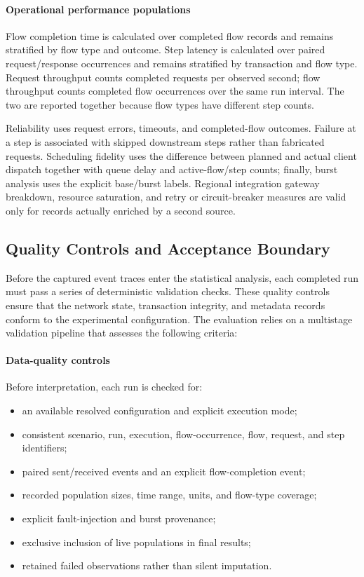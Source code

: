 \paragraph{Operational performance populations}
\noindent Flow completion time is calculated over completed flow records and remains
stratified by flow type and outcome. Step latency is calculated over paired
request/response occurrences and remains stratified by transaction and flow
type. Request throughput counts completed requests per observed second;
flow throughput counts completed flow occurrences over the same run interval.
The two are reported together because flow types have different step counts.

\noindent Reliability uses request errors, timeouts, and completed-flow outcomes. Failure
at a step is associated with skipped downstream steps rather than fabricated
requests. Scheduling fidelity uses the difference between planned and actual
client dispatch together with queue delay and active-flow/step counts; finally, burst analysis uses the explicit base/burst labels. Regional integration gateway breakdown, resource saturation, and retry or circuit-breaker measures are valid only for records actually enriched by a second source.

\subsection{Quality Controls and Acceptance Boundary}
\label{subsec:rdg-quality-acceptance}

\noindent Before the captured event traces enter the statistical analysis, each
completed run must pass a series of deterministic validation checks. These
quality controls ensure that the network state, transaction integrity, and
metadata records conform to the experimental configuration. The evaluation
relies on a multistage validation pipeline that assesses the following
criteria:

\paragraph{Data-quality controls}
\noindent Before interpretation, each run is checked for:
\begin{itemize}
    \item an available resolved configuration and explicit execution mode;
    \item consistent scenario, run, execution, flow-occurrence, flow, request,
    and step identifiers;
    \item paired sent/received events and an explicit flow-completion event;
    \item recorded population sizes, time range, units, and flow-type coverage;
    \item explicit fault-injection and burst provenance;
    \item exclusive inclusion of live populations in final results;
    \item retained failed observations rather than silent imputation.
\end{itemize}


